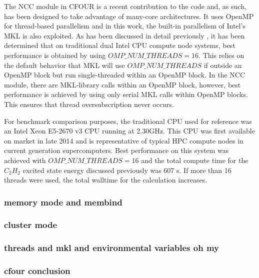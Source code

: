 The NCC module in CFOUR is a recent contribution to the code and, as such, has been designed to take
advantage of many-core architectures. It uses OpenMP for thread-based parallelism and in this work, the
built-in parallelism of Intel's MKL is also exploited. As has been discussed in detail previously \cite{ncc:15},
it has been determined that on traditional dual Intel CPU compute node systems, best performance is obtained 
by using $OMP\_NUM\_THREADS=16$. This relies on the default behavior that MKL will use $OMP\_NUM\_THREADS$ 
if outside an OpenMP block but run single-threaded within an OpenMP block. In the NCC module, there are MKL-library 
calls within an OpenMP block, however, best performance is achieved by using only serial MKL calls within OpenMP
blocks. This ensures that thread oversubscription never occurs.

For benchmark comparison purposes, the traditional CPU used for reference was an Intel Xeon  E5-2670 v3 CPU
running at 2.30GHz. This CPU was first available on market in late 2014 and is representative of typical HPC 
compute nodes in current generation supercomputers. Best performance on this system was achieved with 
$OMP\_NUM\_THREADS=16$ and the total compute time for the $C_2H_2$ excited state energy discussed previously
was 607 s. If more than 16 threads were used, the total walltime for the calculation increases.

\subsubsection{memory mode and membind}
\subsubsection{cluster mode}
\subsubsection{threads and mkl and environmental variables oh my}
\subsubsection{cfour conclusion}
